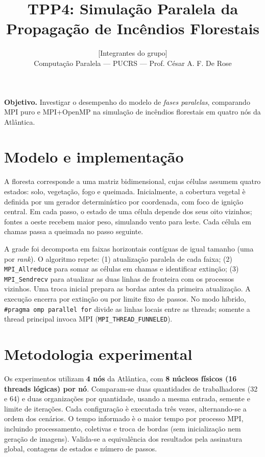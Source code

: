 \documentclass[10pt,a4paper,twocolumn]{article}
\title{\vspace{-1.4cm}\bfseries\normalsize TPP4: Simula\c{c}\~ao Paralela da Propaga\c{c}\~ao de Inc\^endios Florestais}
\author{\small [Integrantes do grupo] \\ \small Computa\c{c}\~ao Paralela --- PUCRS --- Prof. C\'esar A. F. De Rose}
\date{\vspace{-0.8cm}}
\begin{document}
\maketitle
\vspace{-1.4em}
\noindent\textbf{Objetivo.} Investigar o desempenho do modelo de \emph{fases paralelas}, comparando MPI puro e MPI+OpenMP na simula\c{c}\~ao de inc\^endios florestais em quatro n\'os da Atl\^antica.

\section*{Modelo e implementa\c{c}\~ao}
A floresta corresponde a uma matriz bidimensional, cujas c\'elulas assumem quatro estados: solo, vegeta\c{c}\~ao, fogo e queimada. Inicialmente, a cobertura vegetal \`e definida por um gerador determin\'istico por coordenada, com foco de igni\c{c}\~ao central. Em cada passo, o estado de uma c\'elula depende dos seus oito vizinhos; fontes a oeste recebem maior peso, simulando vento para leste. Cada c\'elula em chamas passa a queimada no passo seguinte.

A grade foi decomposta em faixas horizontais cont\'iguas de igual tamanho (uma por \emph{rank}). O algoritmo repete: (1) atualiza\c{c}\~ao paralela de cada faixa; (2) \texttt{MPI\_Allreduce} para somar as c\'elulas em chamas e identificar extin\c{c}\~ao; (3) \texttt{MPI\_Sendrecv} para atualizar as duas linhas de fronteira com os processos vizinhos. Uma troca inicial prepara as bordas antes da primeira atualiza\c{c}\~ao. A execu\c{c}\~ao encerra por extin\c{c}\~ao ou por limite fixo de passos. No modo h\'ibrido, \texttt{\#pragma omp parallel for} divide as linhas locais entre as threads; somente a thread principal invoca MPI (\texttt{MPI\_THREAD\_FUNNELED}).

\section*{Metodologia experimental}
Os experimentos utilizam \textbf{4 n\'os} da Atl\^antica, com \textbf{8 n\'ucleos f\'isicos (16 threads l\'ogicas) por n\'o}. Comparam-se duas quantidades de trabalhadores (32 e 64) e duas organiza\c{c}\~oes por quantidade, usando a mesma entrada, semente e limite de itera\c{c}\~oes. Cada configura\c{c}\~ao \`e executada tr\^es vezes, alternando-se a ordem dos cen\'arios. O tempo informado \`e o maior tempo por processo MPI, incluindo processamento, coletivas e troca de bordas (sem inicializa\c{c}\~ao nem gera\c{c}\~ao de imagens). Valida-se a equival\^encia dos resultados pela assinatura global, contagens de estados e n\'umero de passos.
\end{document}
